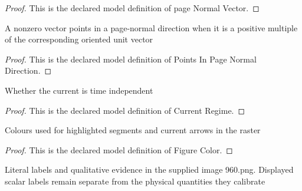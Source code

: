 \begin{proof}
  This is the declared model definition of page Normal Vector.
\end{proof}
\begin{definition}
  \label{def:physics:phyx-mini-0960:phyxminiproblems-problemphyxmini0960-pointsinpagenormaldirection}
  A nonzero vector points in a page-normal direction when it is a positive multiple of the corresponding oriented unit vector
\end{definition}
\begin{proof}
  This is the declared model definition of Points In Page Normal Direction.
\end{proof}
\begin{definition}
  \label{def:physics:phyx-mini-0960:phyxminiproblems-problemphyxmini0960-currentregime}
  Whether the current is time independent
\end{definition}
\begin{proof}
  This is the declared model definition of Current Regime.
\end{proof}
\begin{definition}
  \label{def:physics:phyx-mini-0960:phyxminiproblems-problemphyxmini0960-figurecolor}
  Colours used for highlighted segments and current arrows in the raster
\end{definition}
\begin{proof}
  This is the declared model definition of Figure Color.
\end{proof}
\begin{definition}
  \label{def:physics:phyx-mini-0960:phyxminiproblems-problemphyxmini0960-opposedwiresegmentsfigure}
  Literal labels and qualitative evidence in the supplied image 960.png. Displayed scalar labels remain separate from the physical quantities they calibrate
\end{definition}
